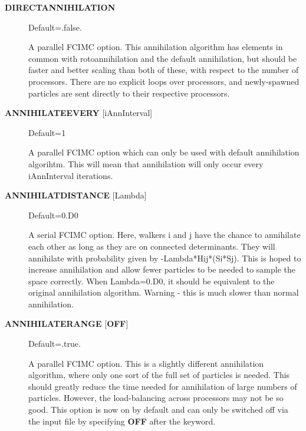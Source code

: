 \documentclass[openany,a4paper,10pt,english]{manual}
\begin{document}
\begin{description}
\item[\textbf{DIRECTANNIHILATION}] \leavevmode
Default=.false.

A parallel FCIMC option. This annihilation algorithm has elements in common with rotoannihilation
and the default annihilation, but should be faster and better scaling than both of these, with
respect to the number of processors. There are no explicit loops over processors, and newly-spawned
particles are sent directly to their respective processors.

\item[\textbf{ANNIHILATEEVERY} {[}iAnnInterval{]}] \leavevmode
Default=1

A parallel FCIMC option which can only be used with default annihilation algorihtm. This will
mean that annihilation will only occur every iAnnInterval iterations.

\item[\textbf{ANNIHILATDISTANCE} {[}Lambda{]}] \leavevmode
Default=0.D0

A serial FCIMC option. Here, walkers i and j have the chance to annihilate each other
as long as they are on connected determinants. They will annihilate with probability
given by -Lambda*Hij*(Si*Sj). This is hoped to increase annihilation and allow fewer
particles to be needed to sample the space correctly. When Lambda=0.D0, it should be
equivalent to the original annihilation algorithm. Warning - this is much slower than
normal annihilation.

\item[\textbf{ANNIHILATERANGE} {[}\textbf{OFF}{]}] \leavevmode
Default=.true.

A parallel FCIMC option. This is a slightly different annihilation algorithm, where only
one sort of the full set of particles is needed. This should greatly reduce the time needed
for annihilation of large numbers of particles. However, the load-balancing across processors
may not be so good. This option is now on by default and can only be switched off via the input
file by specifying \textbf{OFF} after the keyword.

\end{description}
\end{document}

